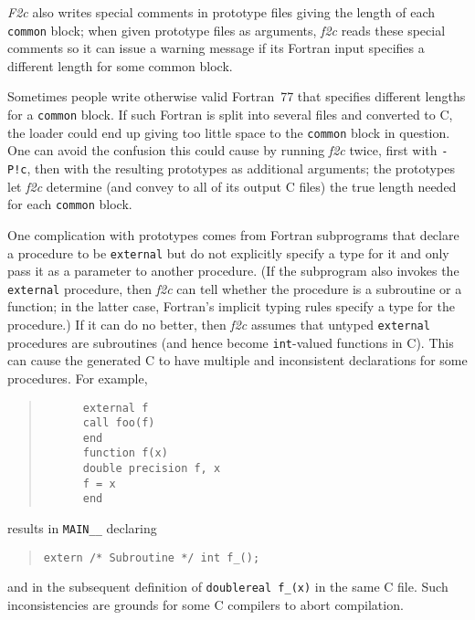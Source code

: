 \documentclass[12pt]{article}
\begin{document}
\emph{F2c} also writes special comments in prototype files giving the length of each \verb|common| block; when given prototype files as arguments, \emph{f2c} reads these special comments so it can issue a warning message if its Fortran input specifies a different length for some common block.

Sometimes people write otherwise valid Fortran~77 that specifies different lengths for a \verb|common| block. If such Fortran is split into several files and converted to C, the loader could end up giving too little space to the \verb|common| block in question. One can avoid the confusion this could cause by running \emph{f2c} twice, first with \verb|-P!c|, then with the resulting prototypes as additional arguments; the prototypes let \emph{f2c} determine (and convey to all of its output C files) the true length needed for each \verb|common| block.

One complication with prototypes comes from Fortran subprograms that declare a procedure to be \verb|external| but do not explicitly specify a type for it and only pass it as a parameter to another procedure. (If the subprogram also invokes the \verb|external| procedure, then \emph{f2c} can tell whether the procedure is a subroutine or a function; in the latter case, Fortran’s implicit typing rules specify a type for the procedure.) If it can do no better, then \emph{f2c} assumes that untyped \verb|external| procedures are subroutines (and hence become \verb|int|-valued functions in C). This can cause the generated C to have multiple and inconsistent declarations for some procedures. For example,
\begin{quote}
\begin{verbatim}
      external f
      call foo(f)
      end
      function f(x)
      double precision f, x
      f = x
      end
\end{verbatim}
\end{quote}
results in \verb|MAIN__| declaring
\begin{quote}
\begin{verbatim}
extern /* Subroutine */ int f_();
\end{verbatim}
\end{quote}
and in the subsequent definition of \verb|doublereal f_(x)| in the same C file. Such inconsistencies are grounds for some C compilers to abort compilation.
\end{document}
